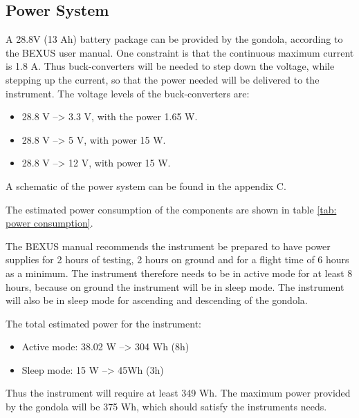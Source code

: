 \pagebreak
\subsection{Power System}

\label{sec:4.7}

A 28.8V (13 Ah) battery package can be provided by the gondola, according to the BEXUS user manual. One constraint is that the continuous maximum current is 1.8 A. Thus buck-converters will be needed to step down the voltage, while stepping up the current, so that the power needed will be delivered to the instrument. The voltage levels of the buck-converters are:

\begin{itemize}
	\item 28.8 V --> 3.3 V, with the power 1.65 W.
	\item 28.8 V --> 5 V, with power 15 W.
	\item 28.8 V --> 12 V, with power 15 W.
\end{itemize}

A schematic of the power system can be found in the appendix C.

The estimated power consumption of the components are shown in table \ref{tab: power consumption}.



\newpage

The BEXUS manual recommends the instrument be prepared to have power supplies for 2 hours of testing, 2 hours on ground and for a flight time of 6 hours as a minimum. The instrument therefore needs to be in active mode for at least 8 hours, because on ground the instrument will be in sleep mode. The instrument will also be in sleep mode for ascending and descending of the gondola. 

The total estimated power for the instrument:

\begin{itemize}
    \item Active mode: 38.02 W  --> 304 Wh (8h)
    \item Sleep mode: 15 W --> 45Wh (3h)
\end{itemize}

Thus the instrument will require at least 349 Wh. The maximum power provided by the gondola will be 375 Wh, which should satisfy the instruments needs.


\raggedbottom
